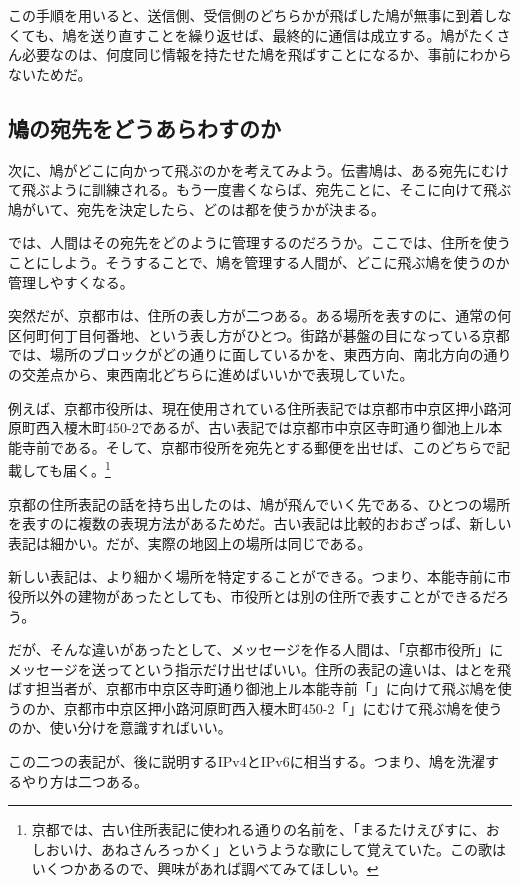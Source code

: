 この手順を用いると、送信側、受信側のどちらかが飛ばした鳩が無事に到着しなくても、鳩を送り直すことを繰り返せば、最終的に通信は成立する。鳩がたくさん必要なのは、何度同じ情報を持たせた鳩を飛ばすことになるか、事前にわからないためだ。

\subsection{鳩の宛先をどうあらわすのか}
次に、鳩がどこに向かって飛ぶのかを考えてみよう。伝書鳩は、ある宛先にむけて飛ぶように訓練される。もう一度書くならば、宛先ことに、そこに向けて飛ぶ鳩がいて、宛先を決定したら、どのは都を使うかが決まる。

では、人間はその宛先をどのように管理するのだろうか。ここでは、住所を使うことにしよう。そうすることで、鳩を管理する人間が、どこに飛ぶ鳩を使うのか管理しやすくなる。

突然だが、京都市は、住所の表し方が二つある。ある場所を表すのに、通常の何区何町何丁目何番地、という表し方がひとつ。街路が碁盤の目になっている京都では、場所のブロックがどの通りに面しているかを、東西方向、南北方向の通りの交差点から、東西南北どちらに進めばいいかで表現していた。

例えば、京都市役所は、現在使用されている住所表記では京都市中京区押小路河原町西入榎木町450-2であるが、古い表記では京都市中京区寺町通り御池上ル本能寺前である。そして、京都市役所を宛先とする郵便を出せば、このどちらで記載しても届く。\footnote{京都では、古い住所表記に使われる通りの名前を、「まるたけえびすに、おしおいけ、あねさんろっかく」というような歌にして覚えていた。この歌はいくつかあるので、興味があれば調べてみてほしい。}

京都の住所表記の話を持ち出したのは、鳩が飛んでいく先である、ひとつの場所を表すのに複数の表現方法があるためだ。古い表記は比較的おおざっぱ、新しい表記は細かい。だが、実際の地図上の場所は同じである。

新しい表記は、より細かく場所を特定することができる。つまり、本能寺前に市役所以外の建物があったとしても、市役所とは別の住所で表すことができるだろう。

だが、そんな違いがあったとして、メッセージを作る人間は、「京都市役所」にメッセージを送ってという指示だけ出せばいい。住所の表記の違いは、はとを飛ばす担当者が、京都市中京区寺町通り御池上ル本能寺前「」に向けて飛ぶ鳩を使うのか、京都市中京区押小路河原町西入榎木町450-2「」にむけて飛ぶ鳩を使うのか、使い分けを意識すればいい。

この二つの表記が、後に説明するIPv4とIPv6に相当する。つまり、鳩を洗濯するやり方は二つある。


